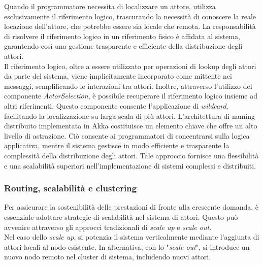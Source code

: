 Quando il programmatore necessita di localizzare un attore, utilizza esclusivamente il riferimento logico, trascurando la necessità di conoscere la reale locazione dell'attore, che potrebbe essere sia locale che remota.
La responsabilità di risolvere il riferimento logico in un riferimento fisico è affidata al sistema, garantendo così una gestione trasparente e efficiente della distribuzione degli attori. \\
Il riferimento logico, oltre a essere utilizzato per operazioni di lookup degli attori da parte del sistema, viene implicitamente incorporato come mittente nei messaggi, semplificando le interazioni tra attori.
Inoltre, attraverso l'utilizzo del componente \textit{ActorSelection}, è possibile recuperare il riferimento logico insieme ad altri riferimenti.
Questo componente consente l'applicazione di \textit{wildcard}, facilitando la localizzazione su larga scala di più attori.
L'architettura di naming distribuito implementata in Akka costituisce un elemento chiave che offre un alto livello di astrazione.
Ciò consente ai programmatori di concentrarsi sulla logica applicativa, mentre il sistema gestisce in modo efficiente e trasparente la complessità della distribuzione degli attori.
Tale approccio fornisce una flessibilità e una scalabilità superiori nell'implementazione di sistemi complessi e distribuiti.

\subsubsection[Routing, scalabilità e clustering]{Routing, scalabilità e clustering}
Per assicurare la sostenibilità delle prestazioni di fronte alla crescente domanda, è essenziale adottare strategie di scalabilità nel sistema di attori.
Questo può avvenire attraverso gli approcci tradizionali di \textit{scale up} e \textit{scale out}. \\
Nel caso dello \textit{scale up}, si potenzia il sistema verticalmente mediante l'aggiunta di attori locali al nodo esistente.
In alternativa, con lo "\textit{scale out}", si introduce un nuovo nodo remoto nel cluster di sistema, includendo nuovi attori.

